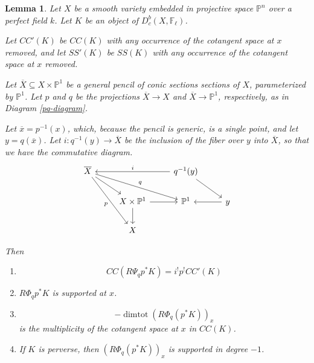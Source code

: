 \documentclass[12pt]{amsart}
\newtheorem{lemma}[theorem]{Lemma}
\theoremstyle{definition}
\theoremstyle{remark}
\begin{document}
\begin{lemma}\label{final-nearby-formula} Let $X$ be a smooth variety embedded in projective space $\mathbb P^n$ over a perfect field $k$. Let $K$ be an object of $D^b_c(X, \mathbb F_\ell)$.

Let $CC'(K)$ be $CC(K)$ with any occurrence of the cotangent space at $x$ removed, and let $SS'(K)$ be $SS(K)$ with any occurrence of the cotangent space at $x$ removed. 


Let $\overline{X} \subseteq X \times \mathbb P^1$ be a general pencil of conic sections sections of $X$, parameterized by $\mathbb P^1$.  Let $p$ and $q$ be the projections $\overline{X} \to X$ and $\overline{X} \to \mathbb P^1$, respectively, as in Diagram \ref{pq-diagram}. 

Let $\overline{x} = p^{-1}(x)$, which, because the pencil is generic, is a single point, and let $y= q(\overline{x})$. Let $i : q^{-1}(y) \to \overline{X}$ be the inclusion of the fiber over $y$ into $\overline{X}$, so that we have the commutative diagram. \begin{equation}\label{pqi-diagram}\begin{tikzcd} \overline{X}  \arrow[ddr,"p"'] \arrow[drr,"q"] \arrow[dr]  &  &  q^{-1}(y) \arrow[ll, "i"'] \arrow[dr] \\  &X \times \mathbb P^1 \arrow[r] \arrow[d] & \mathbb P^1 & y \arrow[l]  \\ & X \end{tikzcd} \end{equation}

Then

\begin{enumerate}

\item \[ CC ( R \Psi_{q} p^*K) = i^! p^! CC'(K)\]

\item  $R\Phi_q p^* K$ is supported at $x$.

\item  \[-\operatorname{dimtot}  \left( R\Phi_q ( p^* K) \right)_x  \] is the multiplicity of the cotangent space at $x$ in $CC(K)$.

\item If $K$ is perverse, then  $\left( R\Phi_q ( p^* K) \right)_x $ is supported in degree $-1$.

\end{enumerate}
  \end{lemma}
\end{document}
